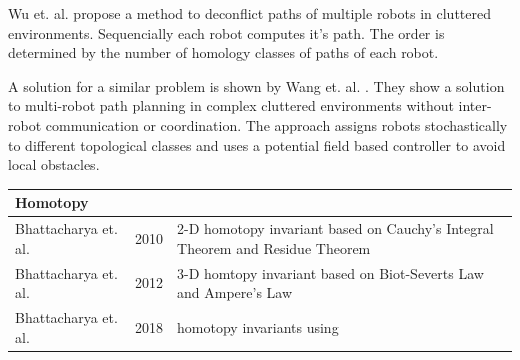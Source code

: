 \documentclass[11pt,twocolumn]{article}
\begin{document}
Wu et. al. \cite{wuMultiRobotPathDeconfliction2020} propose a method
to deconflict paths of multiple robots in cluttered environments.
Sequencially each robot computes it's path. The order is determined by
the number of homology classes of paths of each robot.

A solution for a similar problem is shown by Wang
et. al. \cite{wangCoordinationfreeMultirobotPath2022}. They show a
solution to multi-robot path planning in complex cluttered
environments without inter-robot communication or coordination. The
approach assigns robots stochastically to different topological
classes and uses a potential field based controller to avoid local
obstacles.

\begin{table}
  \centering
  \begin{tabular}{l c p{8cm}}
    \hline
    Homotopy & & \\
    \hline
    Bhattacharya
    et. al. \cite{bhattacharyaSearchbasedPathPlanning2010} & 2010 &
                                                                    2-D
                                                                    homotopy
                                                                    invariant
                                                                    based on
                                                                    Cauchy's
                                                                    Integral
                                                                    Theorem
                                                                    and
                                                                    Residue
                                                                    Theorem \\
    Bhattacharya
    et. al. \cite{bhattacharyaSearchBasedPathPlanning2012} & 2012 & 3-D
                                                                    homtopy
                                                                    invariant
                                                                    based on
                                                                    Biot-Severts
                                                                    Law and
                                                                    Ampere's
                                                                    Law \\
    Bhattacharya et. al. \cite{bhattacharyaPathHomotopyInvariants2018}
             & 2018 &
                      homotopy invariants using

\end{tabular}
\end{table}
\end{document}
